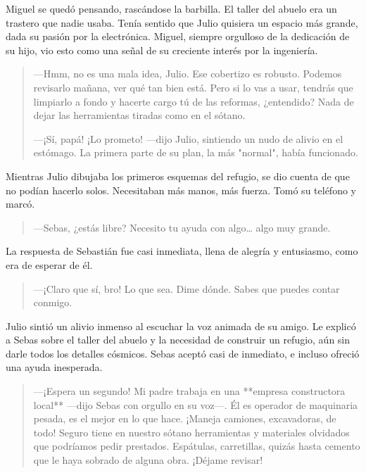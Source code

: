 \documentclass[a4paper,12pt]{book}
\begin{document}
Miguel se quedó pensando, rascándose la barbilla. El taller del abuelo era un trastero que nadie usaba. Tenía sentido que Julio quisiera un espacio más grande, dada su pasión por la electrónica. Miguel, siempre orgulloso de la dedicación de su hijo, vio esto como una señal de su creciente interés por la ingeniería.

\begin{quote}
    —Hmm, no es una mala idea, Julio. Ese cobertizo es robusto. Podemos revisarlo mañana, ver qué tan bien está. Pero si lo vas a usar, tendrás que limpiarlo a fondo y hacerte cargo tú de las reformas, ¿entendido? Nada de dejar las herramientas tiradas como en el sótano.

    —¡Sí, papá! ¡Lo prometo! —dijo Julio, sintiendo un nudo de alivio en el estómago. La primera parte de su plan, la más "normal", había funcionado.
\end{quote}

Mientras Julio dibujaba los primeros esquemas del refugio, se dio cuenta de que no podían hacerlo solos. Necesitaban más manos, más fuerza. Tomó su teléfono y marcó.

\begin{quote}
    —Sebas, ¿estás libre? Necesito tu ayuda con algo… algo muy grande.
\end{quote}

La respuesta de Sebastián fue casi inmediata, llena de alegría y entusiasmo, como era de esperar de él.

\begin{quote}
    —¡Claro que sí, bro! Lo que sea. Dime dónde. Sabes que puedes contar conmigo.
\end{quote}

Julio sintió un alivio inmenso al escuchar la voz animada de su amigo. Le explicó a Sebas sobre el taller del abuelo y la necesidad de construir un refugio, aún sin darle todos los detalles cósmicos. Sebas aceptó casi de inmediato, e incluso ofreció una ayuda inesperada.

\begin{quote}
    —¡Espera un segundo! Mi padre trabaja en una **empresa constructora local** —dijo Sebas con orgullo en su voz—. Él es operador de maquinaria pesada, es el mejor en lo que hace. ¡Maneja camiones, excavadoras, de todo! Seguro tiene en nuestro sótano herramientas y materiales olvidados que podríamos pedir prestados. Espátulas, carretillas, quizás hasta cemento que le haya sobrado de alguna obra. ¡Déjame revisar!
\end{quote}
\end{document}
